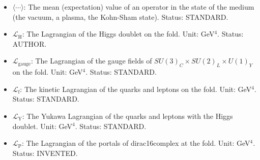 \documentclass[
  10pt,
]{article}
\begin{document}
\begin{itemize}
  \(\mathsf{A}_1\): The time derivative of \(\mathsf{A}\) in units of
  \(H\), \(\mathsf{A}_1 = \mathsf{A}'/H = a_4''/H^2\). Unit:
  dimensionless. Status: DERIVED.
\item
  \(\langle\cdots\rangle\): The mean (expectation) value of an operator
  in the state of the medium (the vacuum, a plasma, the Kohn-Sham
  state). Status: STANDARD.
\item
  \(\mathcal{L}_{\mathrm{H}}\): The Lagrangian of the Higgs doublet on
  the fold. Unit: GeV\(^4\). Status: AUTHOR.
\item
  \(\mathcal{L}_{\mathrm{gauge}}\): The Lagrangian of the gauge fields
  of \(SU(3)_C\times SU(2)_L\times U(1)_Y\) on the fold. Unit:
  GeV\(^4\). Status: STANDARD.
\item
  \(\mathcal{L}_{\mathrm{f}}\): The kinetic Lagrangian of the quarks and
  leptons on the fold. Unit: GeV\(^4\). Status: STANDARD.
\item
  \(\mathcal{L}_{\mathrm{Y}}\): The Yukawa Lagrangian of the quarks and
  leptons with the Higgs doublet. Unit: GeV\(^4\). Status: STANDARD.
\item
  \(\mathcal{L}_{\mathrm{P}}\): The Lagrangian of the portals of
  dirac16complex at the fold. Unit: GeV\(^4\). Status: INVENTED.
\end{itemize}
\end{document}
